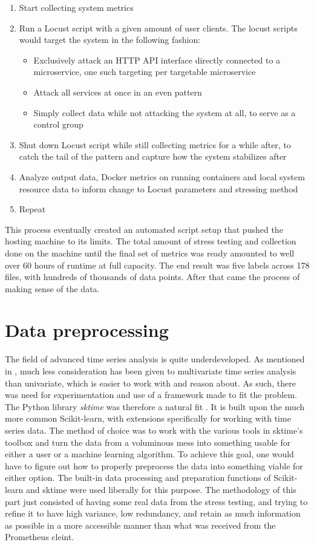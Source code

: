 \begin{enumerate}
    \item Start collecting system metrics
    \item Run a Locust script with a given amount of user clients. The locust scripts would target the system in the following fashion: \begin{itemize}
              \item Exclusively attack an HTTP API interface directly connected to a microservice, one such targeting per targetable microservice
              \item Attack all services at once in an even pattern
              \item Simply collect data while not attacking the system at all, to serve as a control group
          \end{itemize}
    \item Shut down Locust script while still collecting metrics for a while after, to catch the tail of the pattern and capture how the system stabilizes after
    \item Analyze output data, Docker metrics on running containers and local system resource data to inform change to Locust parameters and stressing method
    \item Repeat
\end{enumerate}

This process eventually created an automated script setup that pushed the hosting machine to its limits.
The total amount of stress testing and collection done on the machine until the final set of metrics was ready amounted to well over 60 hours of runtime at full capacity.
The end result was five labels across 178 files, with hundreds of thousands of data points. After that came the process of making sense of the data.

\section*{Data preprocessing}
The field of advanced time series analysis is quite underdeveloped. As mentioned in \cite*{Pasos}, much less consideration has been given to multivariate time series analysis than univariate, which is easier to work with and reason about.
As such, there was need for experimentation and use of a framework made to fit the problem.
The Python library \textit{sktime} was therefore a natural fit \cite*{Kiraly}. It is built upon the much more common Scikit-learn, with extensions specifically for working with time series data.
The method of choice was to work with the various tools in sktime's toolbox and turn the data from a voluminous mess into something usable for either a user or a machine learning algorithm.
To achieve this goal, one would have to figure out how to properly preprocess the data into something viable for either option.
The built-in data processing and preparation functions of Scikit-learn and sktime were used liberally for this purpose.
The methodology of this part just consisted of having some real data from the stress testing, and trying to refine it to have high variance, low redundancy, and retain as much information as possible in a more accessible manner than what was received from the Prometheus cleint.

